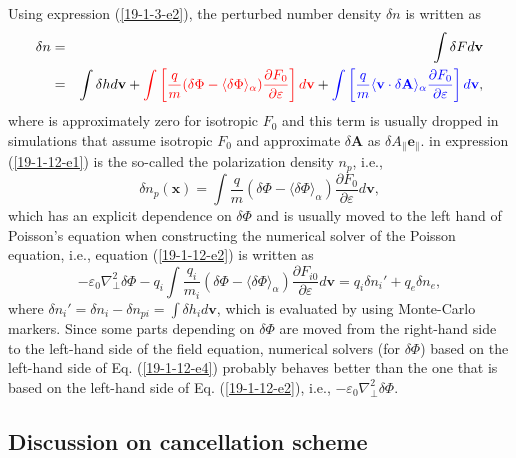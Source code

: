 \documentclass{llncs}
\newcommand{\tmcolor}[2]{{\color{#1}{#2}}}
\begin{document}
Using expression (\ref{19-1-3-e2}), the perturbed number density $\delta n$ is
written as
\begin{eqnarray}
  \delta n & = & \int \delta F d\mathbf{v} \nonumber\\
  & = & \int \delta h d\mathbf{v}+ \tmcolor{red}{\int \left[ \frac{q}{m}
  (\delta \Phi - \langle \delta \Phi \rangle_{\alpha}) \frac{\partial
  F_0}{\partial \varepsilon} \right] d\mathbf{v}} + \tmcolor{blue}{\int \left[
  \frac{q}{m} \langle \mathbf{v} \cdot \delta \mathbf{A} \rangle_{\alpha}
  \frac{\partial F_0}{\partial \varepsilon} \right] d\mathbf{v}}, 
  \label{19-1-12-e1}
\end{eqnarray}
where \tmcolor{blue}{the blue term} is approximately zero for isotropic $F_0$
and this term is usually dropped in simulations that assume isotropic $F_0$
and approximate $\delta \mathbf{A}$ as $\delta A_{\parallel}
\mathbf{e}_{\parallel}$. \tmcolor{red}{The red term} in expression
(\ref{19-1-12-e1}) is the so-called the polarization density $n_p$, i.e.,
\begin{equation}
  \label{18-9-13-p9} \delta n_p (\mathbf{x}) = \int \frac{q }{m} (\delta \Phi
  - \langle \delta \Phi \rangle_{\alpha}) \frac{\partial F_0}{\partial
  \varepsilon} d\mathbf{v},
\end{equation}
which has an explicit dependence on $\delta \Phi$ and is usually moved to the
left hand of Poisson's equation when constructing the numerical solver of the
Poisson equation, i.e., equation (\ref{19-1-12-e2}) is written as
\begin{equation}
  \label{19-1-12-e4} - \varepsilon_0 \nabla^2_{\perp} \delta \Phi - q_i \int
  \frac{q_i}{m_i} (\delta \Phi - \langle \delta \Phi \rangle_{\alpha})
  \frac{\partial F_{i 0}}{\partial \varepsilon} d\mathbf{v}= q_i \delta n_i' +
  q_e \delta n_e,
\end{equation}
where $\delta n_i' = \delta n_i - \delta n_{p i} = \int \delta h_i
d\mathbf{v}$, which is evaluated by using Monte-Carlo markers. Since some
parts depending on $\delta \Phi$ are moved from the right-hand side to the
left-hand side of the field equation, numerical solvers (for $\delta \Phi$)
based on the left-hand side of Eq. (\ref{19-1-12-e4}) probably behaves better
than the one that is based on the left-hand side of Eq. (\ref{19-1-12-e2}),
i.e., $- \varepsilon_0 \nabla^2_{\perp} \delta \Phi$.

\subsection{Discussion on cancellation scheme}
\end{document}
